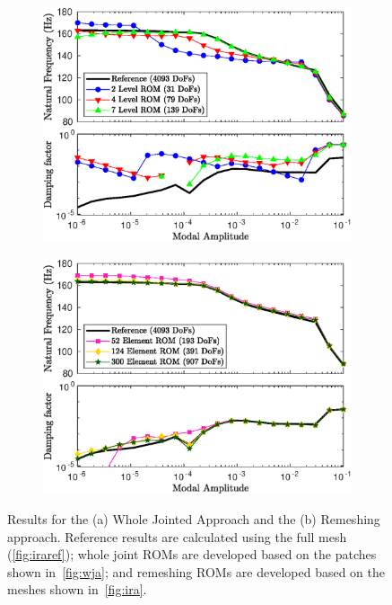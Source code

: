 \documentclass[10pt,print]{article}
\begin{document}
\begin{figure}[!h]
  \centering
  \begin{subfigure}{0.5\linewidth}
    \includegraphics[width=\linewidth]{8621_bal_Fig4a}
    \caption{}
  \end{subfigure}%
  \begin{subfigure}{0.5\linewidth}
    \includegraphics[width=\linewidth]{8621_bal_Fig4b}
    \caption{}
  \end{subfigure}
  \caption{Results for the (a) Whole Jointed Approach and the (b)
    Remeshing approach. Reference results are calculated using the
    full mesh (\cref{fig:iraref}); whole joint ROMs are developed
    based on the patches shown in~\cref{fig:wja}; and remeshing ROMs
    are developed based on the meshes shown in~\cref{fig:ira}.}
  \label{fig:res}
\end{figure}
\end{document}
